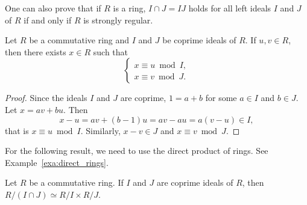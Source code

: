 One can also prove that if $R$ is a ring,
$I\cap J=IJ$ holds 
for all left ideals $I$ and $J$ of $R$ 
if and only if $R$ is strongly regular. 


\begin{theorem}
Let $R$ be a commutative ring and $I$ and $J$ be coprime ideals of $R$. 
If $u,v\in R$, then 
there exists $x\in R$ such that 
\[
\begin{cases}	
x\equiv u\bmod I,\\
x\equiv v\bmod J.
\end{cases}
\]
\end{theorem}

\begin{proof}
Since the ideals $I$ and $J$ are coprime, $1=a+b$ for some $a\in I$ and $b\in J$. 
Let $x=av+bu$. Then
\[
x-u=av+(b-1)u=av-au=a(v-u)\in I,
\]
that is $x\equiv u\bmod I$. Similarly, $x-v\in J$ and $x\equiv v\bmod J$.  	
\end{proof}

For the following result, we need 
to use the direct product of rings. See Example~\ref{exa:direct_rings}. 

\begin{corollary}
\label{cor:chinese}
	Let $R$ be a commutative ring. If $I$ and $J$ are coprime ideals of $R$, 
	then $R/(I\cap J)\simeq R/I\times R/J$.
\end{corollary}

